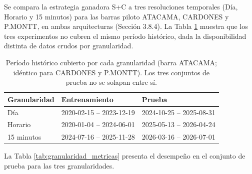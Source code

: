 Se compara la estrategia ganadora S+C a tres resoluciones temporales (Día, Horario y 15 minutos) para las barras piloto ATACAMA, CARDONES y P.MONTT, en ambas arquitecturas (Sección 3.8.4). La Tabla \ref{tab:granularidad_periodos} muestra que los tres experimentos no cubren el mismo período histórico, dada la disponibilidad distinta de datos crudos por granularidad.

\begin{table}[htbp]
    \centering
    \begin{tabular}{lll}
        \toprule
        Granularidad & Entrenamiento & Prueba \\
        \midrule
        Día        & 2020-02-15 -- 2023-12-19 & 2024-10-25 -- 2025-08-31 \\
        Horario    & 2020-01-04 -- 2024-06-01 & 2025-05-13 -- 2026-04-24 \\
        15 minutos & 2024-07-16 -- 2025-11-28 & 2026-03-16 -- 2026-07-01 \\
        \bottomrule
    \end{tabular}
    \caption{Período histórico cubierto por cada granularidad (barra ATACAMA; idéntico para CARDONES y P.MONTT). Los tres conjuntos de prueba no se solapan entre sí.}
    \label{tab:granularidad_periodos}
\end{table}

La Tabla \ref{tab:granularidad_metricas} presenta el desempeño en el conjunto de prueba para las tres granularidades.

